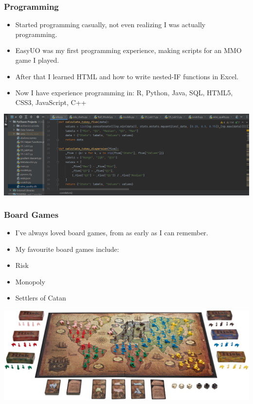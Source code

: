 \documentclass{beamer}
\begin{document}
\begin{frame}
	\frametitle{Programming}
	\begin{itemize}
		\item Started programming casually, not even realizing I was actually programming.  
		\item EasyUO was my first programming experience, making scripts for an MMO game I played.  
		\item After that I learned HTML and how to write nested-IF functions in Excel.
		\item Now I have experience programming in:  R, Python, Java, SQL, HTML5, CSS3, JavaScript, C++
	\end{itemize}
	\begin{center}
		\includegraphics[width = 1.0\textwidth]{images/programming.png}
	\end{center}
\end{frame}
		
\begin{frame}
	\frametitle{Board Games}
	\begin{itemize}
		\item I've always loved board games, from as early as I can remember. 
		\item My favourite board games include:
		\item Risk
		\item Monopoly
		\item Settlers of Catan
	\end{itemize}
	\begin{center}
		\includegraphics[width = 1.0\textwidth]{images/risk.jpg}
	\end{center}
\end{frame}
\end{document}
